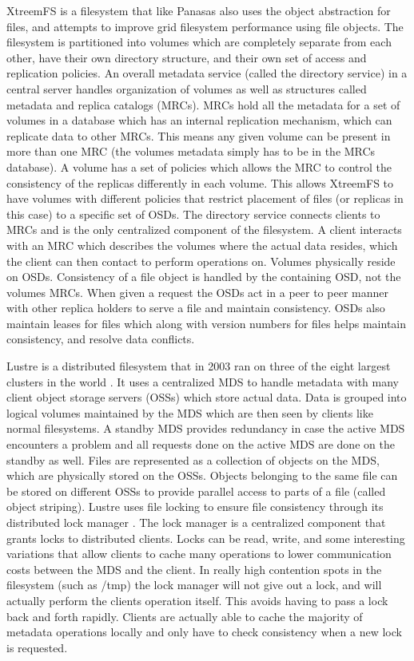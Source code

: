 XtreemFS \cite{Hupfeld2008} is a filesystem that like Panasas also uses the
object abstraction for files, and attempts to improve grid filesystem
performance using file objects.  The filesystem is partitioned into volumes
which are completely separate from each other, have their own directory
structure, and their own set of access and replication policies. An overall
metadata service (called the directory service) in a central server handles
organization of volumes as well as structures called metadata and replica
catalogs (MRCs). MRCs hold all the metadata for a set of volumes in a database
which has an internal replication mechanism, which can replicate data to other
MRCs. This means any given volume can be present in more than one MRC (the
volumes metadata simply has to be in the MRCs database). A volume has a set of
policies which allows the MRC to control the consistency of the replicas
differently in each volume. This allows XtreemFS to have volumes with
different policies that restrict placement of files (or replicas in this case)
to a specific set of OSDs. The directory service connects clients to MRCs and
is the only centralized component of the filesystem. A client interacts with
an MRC which describes the volumes where the actual data resides, which the
client can then contact to perform operations on. Volumes physically reside on
OSDs. Consistency of a file object is handled by the containing OSD, not the
volumes MRCs. When given a request the OSDs act in a peer to peer manner with
other replica holders to serve a file and maintain consistency. OSDs also
maintain leases for files which along with version numbers for files helps
maintain consistency, and resolve data conflicts.


Lustre \cite{Microsystems2007} is a distributed filesystem that in 2003 ran on
three of the eight largest clusters in the world \cite{Schwan2003}. It uses a
centralized MDS to handle metadata with many client object storage servers
(OSSs) which store actual data. Data is grouped into logical volumes
maintained by the MDS which are then seen by clients like normal filesystems.
A standby MDS provides redundancy in case the active MDS encounters a problem
and all requests done on the active MDS are done on the standby as well. Files
are represented as a collection of objects on the MDS, which are physically
stored on the OSSs. Objects belonging to the same file can be stored on
different OSSs to provide parallel access to parts of a file (called object
striping). Lustre uses file locking to ensure file consistency through its
distributed lock manager \cite{Schwan2003}. The lock manager is a centralized
component that grants locks to distributed clients. Locks can be read, write,
and some interesting variations that allow clients to cache many operations to
lower communication costs between the MDS and the client. In really high
contention spots in the filesystem (such as /tmp) the lock manager will not
give out a lock, and will actually perform the clients operation itself. This
avoids having to pass a lock back and forth rapidly. Clients are actually able
to cache the majority of metadata operations locally and only have to check
consistency when a new lock is requested.


